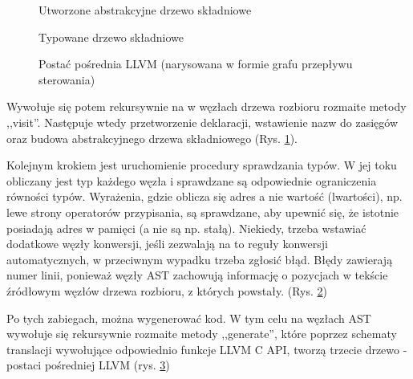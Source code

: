 \begin{landscape}
\begin{figure}[p]
    \centering
    
    \caption{Utworzone abstrakcyjne drzewo składniowe}
    \label{img_ast}
\end{figure}
\end{landscape}

\begin{landscape}
\begin{figure}[p]
    \centering
    
    \caption{Typowane drzewo składniowe}
    \label{img_tpast}
\end{figure}
\end{landscape}
\begin{figure}[H]
    \centering
    
    \caption{Postać pośrednia LLVM (narysowana w formie grafu przepływu sterowania)}
    \label{img:img_llvm_ctrl_flow}
\end{figure}
\newpage%

Wywołuje się potem rekursywnie na w węzłach drzewa rozbioru rozmaite metody ,,visit''. Następuje wtedy przetworzenie deklaracji, wstawienie nazw do zasięgów oraz budowa abstrakcyjnego drzewa składniowego (Rys. \ref{img_ast}).

Kolejnym krokiem jest uruchomienie procedury sprawdzania typów. W jej toku obliczany jest typ każdego węzła i sprawdzane są odpowiednie ograniczenia równości typów. Wyrażenia, gdzie oblicza się adres a nie wartość (lwartości), np. lewe strony operatorów przypisania, są sprawdzane, aby upewnić się, że istotnie posiadają adres w pamięci (a nie są np. stałą). Niekiedy, trzeba wstawiać dodatkowe węzły konwersji, jeśli zezwalają na to reguły konwersji automatycznych, w przeciwnym wypadku trzeba zgłosić błąd. Błędy zawierają numer linii, ponieważ węzły AST zachowują informację o pozycjach w tekście źródłowym węzłów drzewa rozbioru, z których powstały. (Rys. \ref{img_tpast})

Po tych zabiegach, można wygenerować kod. W tym celu na węzłach AST wywołuje się rekursywnie rozmaite metody ,,generate'', które poprzez schematy translacji wywołujące odpowiednio funkcje LLVM C API, tworzą trzecie drzewo - postaci pośredniej LLVM (rys. \ref{img:img_llvm_ctrl_flow}) 


